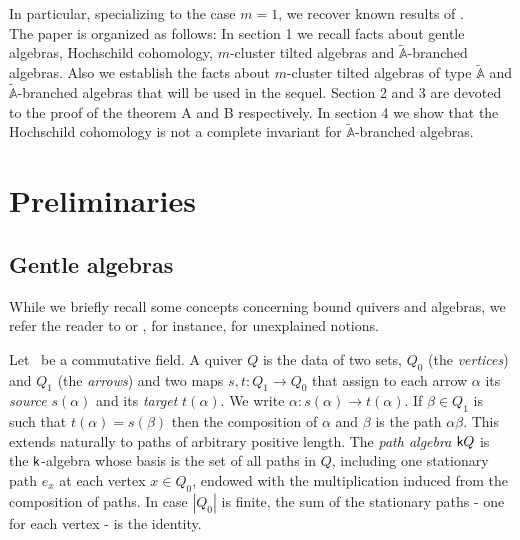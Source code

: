 \documentclass{amsart}
\theoremstyle{plain}
\theoremstyle{definition}
\begin{document}
In particular, specializing to the case $m=1$, we recover known results of \cite{Va}.\\

The paper is organized as follows: In section 1 we recall facts about gentle algebras, Hochschild cohomology, $m$-cluster tilted algebras and $\widetilde{\mathbb{A}}$-branched algebras. Also  we establish the facts about $m$-cluster tilted algebras of type $\mathbb{\widetilde{A}}$ and $\widetilde{\mathbb{A}}$-branched algebras that will be used in the sequel. Section 2  and 3 are devoted to the proof of the theorem  A and B respectively.
In section 4 we show that the Hochschild cohomology  is not a complete invariant for $\tilde{\mathbb{A}}$-branched algebras.\\

\section{Preliminaries}

\subsection{Gentle algebras}
While we briefly recall some  concepts concerning bound quivers and algebras, we refer the reader to \cite{ASS06} or \cite{ARS95}, for instance, for unexplained notions.

Let {{}} \  be a commutative field. A quiver $Q$ is the data of two sets, $Q_0$ (the \textit{vertices}) and $Q_1$ (the \textit{arrows}) and two maps {${s,t}\colon {Q_1} \to {Q_0}$} that assign to each arrow ${\alpha}$ its \textit{source} $s({\alpha})$ and its \textit{target} $t({\alpha})$. We write {${\alpha}\colon {s({\alpha})} \to {t({\alpha})}$}. If ${\beta}\in Q_1$ is such that $t({\alpha})=s({\beta})$ then the composition of ${\alpha}$ and ${\beta}$ is the path ${\alpha}{\beta}$. This extends naturally to paths of arbitrary positive length. The \emph{path algebra} ${{\normalfont{\textsf{k}}}} Q$ is the ${{\normalfont{\textsf{k}}}}$-algebra whose basis is the set of all paths in $Q$, including one stationary path $e_x$ at each vertex $x\in Q_0$, endowed with the  multiplication induced from the composition of paths. In case $|Q_0|$ is finite, the sum of the stationary paths  - one for each vertex - is the identity.
\end{document}
